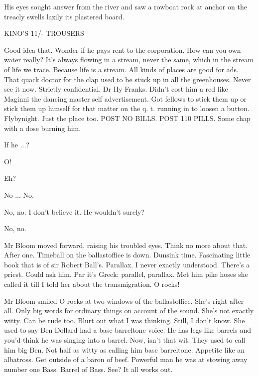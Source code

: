 His eyes sought answer from the river and saw a rowboat rock at anchor
on the treacly swells lazily its plastered board.

KINO'S
11/-
TROUSERS

Good idea that. Wonder if he pays rent to the corporation. How can
you own water really? It's always flowing in a stream, never the same,
which in the stream of life we trace. Because life is a stream. All kinds
of places are good for ads. That quack doctor for the clap used to be
stuck up in all the greenhouses. Never see it now. Strictly confidential.
Dr Hy Franks. Didn't cost him a red like Maginni the dancing master self
advertisement. Got fellows to stick them up or stick them up himself for
that matter on the q. t. running in to loosen a button. Flybynight. Just
the place too. POST NO BILLS. POST 110 PILLS. Some chap with a dose
burning him.

If he ...?

O!

Eh?

No ... No.

No, no. I don't believe it. He wouldn't surely?

No, no.

Mr Bloom moved forward, raising his troubled eyes. Think no more about
that. After one. Timeball on the ballastoffice is down. Dunsink time.
Fascinating little book that is of sir Robert Ball's. Parallax. I never
exactly understood. There's a priest. Could ask him. Par it's Greek:
parallel, parallax. Met him pike hoses she called it till I told her about
the transmigration. O rocks!

Mr Bloom smiled O rocks at two windows of the ballastoffice. She's
right after all. Only big words for ordinary things on account of the
sound. She's not exactly witty. Can be rude too. Blurt out what I was
thinking. Still, I don't know. She used to say Ben Dollard had a base
barreltone voice. He has legs like barrels and you'd think he was singing
into a barrel. Now, isn't that wit. They used to call him big Ben. Not
half as witty as calling him base barreltone. Appetite like an albatross.
Get outside of a baron of beef. Powerful man he was at stowing away number
one Bass. Barrel of Bass. See? It all works out.


